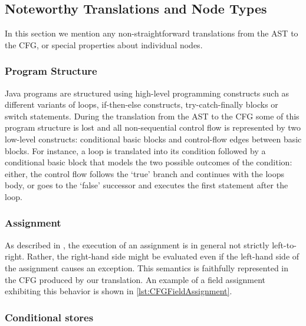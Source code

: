 \subsection{Noteworthy Translations and Node Types}
\label{sec:noteworthy-translations}

In this section we mention any non-straightforward translations from the AST to
the CFG, or special properties about individual nodes.


\subsubsection{Program Structure}
\label{sec:prog-structure}

Java programs are structured using high-level programming constructs such as
different variants of loops, if-then-else constructs, try-catch-finally blocks
or switch statements.  During the translation from the AST to the CFG some
of this program structure is lost and all non-sequential control flow is
represented by two low-level constructs: conditional basic blocks and
control-flow edges between basic blocks. For instance, a  loop is translated
into its condition followed by a conditional basic block that models the two
possible outcomes of the condition: either, the control flow follows the
`true' branch and continues with the loops body, or goes to the `false'
successor and executes the first statement after the loop.


\subsubsection{Assignment}

As described in , the execution of an assignment is in general
not strictly left-to-right. Rather, the right-hand side might be evaluated even
if the left-hand side of the assignment causes an exception. This semantics is faithfully
represented in the CFG produced by our translation.
An example of a field assignment exhibiting this behavior is shown in \autoref{lst:CFGFieldAssignment}.



\subsubsection{Conditional stores}
\label{sec:cond-stores}

